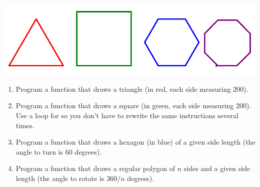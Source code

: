 \documentclass[11pt,class=report,crop=false]{standalone}
\begin{document}

\begin{activite}[Turtle]


\begin{center}
\includegraphics[scale=\myscale,scale=0.4]{screen-functions-tortue}
\end{center}

\begin{enumerate}
  \item Program a function  that draws a triangle (in red, each side measuring $200$).

  \item Program a function  that draws a square (in green, each side measuring $200$). Use a loop \og{}for\fg{} so you don't have to rewrite the same instructions several times.  
  
  \item Program a  function that draws a hexagon (in blue) of a given side length (the angle to turn is $60$ degrees).
  
  
  \item Program a function  that draws a regular polygon of $n$ sides and a given side length (the angle to rotate is $360/n$ degrees). 
\end{enumerate}

\end{activite}




\end{document}
